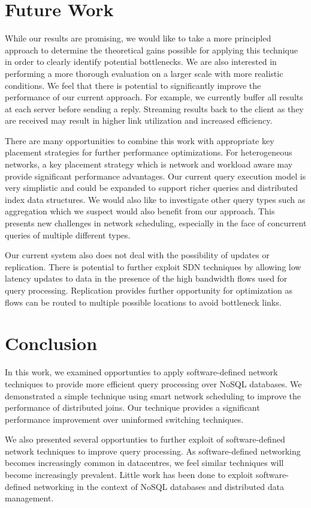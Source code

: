 \documentclass{sig-alternate-2013}
\begin{document}
\section{Future Work}

While our results are promising, we would like to take a more principled approach to determine the theoretical gains possible for applying this technique in order to clearly identify potential bottlenecks.
We are also interested in performing a more thorough evaluation on a larger scale with more realistic conditions.
We feel that there is potential to significantly improve the performance of our current approach.
For example, we currently buffer all results at each server before sending a reply.
Streaming results back to the client as they are received may result in higher link utilization and increased efficiency.

There are many opportunities to combine this work with appropriate key placement strategies for further performance optimizations.
For heterogeneous networks, a key placement strategy which is network and workload aware may provide significant performance advantages.
Our current query execution model is very simplistic and could be expanded to support richer queries and distributed index data structures.
We would also like to investigate other query types such as aggregation which we suspect would also benefit from our approach.
This presents new challenges in network scheduling, especially in the face of concurrent queries of multiple different types.

Our current system also does not deal with the possibility of updates or replication.
There is potential to further exploit SDN techniques by allowing low latency updates to data in the presence of the high bandwidth flows used for query processing.
Replication provides further opportunity for optimization as flows can be routed to multiple possible locations to avoid bottleneck links.

\section{Conclusion}

In this work, we examined opportunties to apply software-defined network techniques to provide more efficient query processing over NoSQL databases.
We demonstrated a simple technique using smart network scheduling to improve the performance of distributed joins.
Our technique provides a significant performance improvement over uninformed switching techniques.

We also presented several opportunties to further exploit of software-defined network techniques to improve query processing.
As software-defined networking becomes increasingly common in datacentres, we feel similar techniques will become increasingly prevalent.
Little work has been done to exploit software-defined networking in the context of NoSQL databases and distributed data management.

\let\theOLDbibliography\thebibliography\renewcommand{\thebibliography}[1]{\theOLDbibliography{#1}%
\item[]\vspace*{0.5mm}}


{\scriptsize

}
\end{document}
